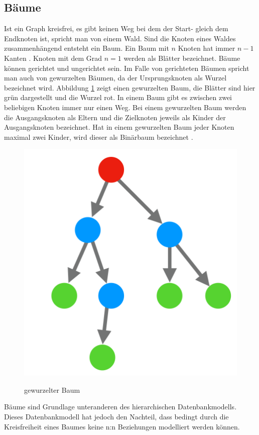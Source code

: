 \subsection{Bäume}
Ist ein Graph kreisfrei, es gibt keinen Weg bei dem der Start- gleich dem Endknoten ist, spricht man von einem Wald.
Sind die Knoten eines Waldes zusammenhängend entsteht ein Baum.
Ein Baum mit $n$ Knoten hat immer $n-1$ Kanten \cite{basicgraphtheory}.
Knoten mit dem Grad $n=1$ werden als Blätter bezeichnet.
Bäume können gerichtet und ungerichtet sein.
Im Falle von gerichteten Bäumen spricht man auch von gewurzelten Bäumen, da der Ursprungsknoten als Wurzel bezeichnet wird.
Abbildung \ref{fig:baum} zeigt einen gewurzelten Baum, die Blätter sind hier grün dargestellt und die Wurzel rot.
In einem Baum gibt es zwischen zwei beliebigen Knoten immer nur einen Weg.
Bei einem gewurzelten Baum werden die Ausgangsknoten als Eltern und die Zielknoten jeweils als Kinder der Ausgangsknoten bezeichnet.
Hat in einem gewurzelten Baum jeder Knoten maximal zwei Kinder, wird dieser als Binärbaum bezeichnet \cite{basicgraphtheory}.
\begin{figure}[H]
	\begin{center}
	\includegraphics[scale = 0.3]{./images/baum.png}
	\label{fig:baum}
    \caption{gewurzelter Baum}
	\end{center}
\end{figure}
Bäume sind Grundlage unteranderen des hierarchischen Datenbankmodells.
Dieses Datenbankmodell hat jedoch den Nachteil, dass bedingt durch die Kreisfreiheit eines Baumes keine n:n Beziehungen modelliert werden können.
